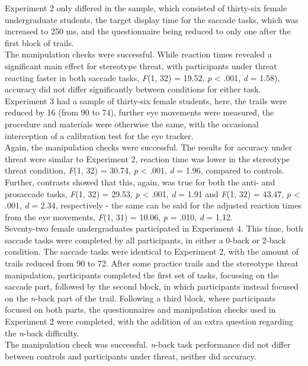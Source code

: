 \documentclass[
  stu,floatsintext]{apa7}
\begin{document}
Experiment 2 only differed in the sample, which consisted of thirty-six female undergraduate students, the target display time for the saccade tasks, which was increased to 250 ms, and the questionnaire being reduced to only one after the first block of trails.\\
The manipulation checks were successful.
While reaction times revealed a significant main effect for stereotype threat, with participants under threat reacting faster in both saccade tasks, \emph{F}(1, 32) = 19.52, \emph{p} \textless{} .001, \emph{d} = 1.58), accuracy did not differ significantly between conditions for either task.\\
Experiment 3 had a sample of thirty-six female students, here, the trails were reduced by 16 (from 90 to 74), further eye movements were measured, the procedure and materials were otherwise the same, with the occasional interception of a calibration test for the eye tracker.\\
Again, the manipulation checks were successful.
The results for accuracy under threat were similar to Experiment 2, reaction time was lower in the stereotype threat condition, \emph{F}(1, 32) = 30.74, \emph{p} \textless{} .001, \emph{d} = 1.96, compared to controls.
Further, contrasts showed that this, again, was true for both the anti- and prosaccade tasks, \emph{F}(1, 32) = 29.53, \emph{p} \textless{} .001, \emph{d} = 1.91 and \emph{F}(1, 32) = 43.47, \emph{p} \textless{} .001, \emph{d} = 2.34, respectively - the same can be said for the adjusted reaction times from the eye movements, \emph{F}(1, 31) = 10.06, \emph{p} = .010, \emph{d} = 1.12.\\
Seventy-two female undergraduates participated in Experiment 4.
This time, both saccade tasks were completed by all participants, in either a 0-back or 2-back condition.
The saccade tasks were identical to Experiment 2, with the amount of trails reduced from 90 to 72.
After some practice trails and the stereotype threat manipulation, participants completed the first set of tasks, focussing on the saccade part, followed by the second block, in which participants instead focused on the \emph{n}-back part of the trail.
Following a third block, where participants focused on both parts, the questionnaires and manipulation checks used in Experiment 2 were completed, with the addition of an extra question regarding the \emph{n}-back difficulty.\\
The manipulation check was successful.
\emph{n}-back task performance did not differ between controls and participants under threat, neither did accuracy.
\end{document}
